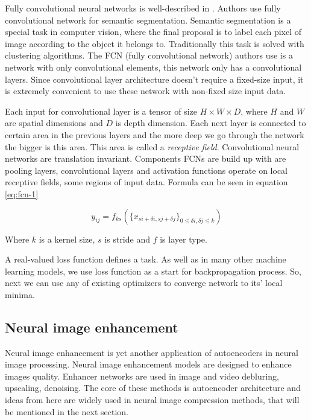 Fully convolutional neural networks is well-described in \cite{fcn}. Authors use fully convolutional network for semantic segmentation. Semantic segmentation is a special task in computer vision, where the final proposal is to label each pixel of image according to the object it belongs to. Traditionally this task is solved with clustering algorithms. The FCN (fully convolutional network) authors use is a network with only convolutional elements, this network only has a convolutional layers. Since convolutional layer architecture doesn't require a fixed-size input, it is extremely convenient to use these network with non-fixed size input data.

Each input for convolutional layer is a tensor of size $H \times W \times D$, where $H$ and $W$ are spatial dimensions and $D$ is depth dimension. Each next layer is connected to certain area in the previous layers and the more deep we go through the network the bigger is this area. This area is called a \textit{receptive field}. Convolutional neural networks are translation invariant. Components FCNs are build up with are pooling layers, convolutional layers and activation functions operate on local receptive fields, some regions of input data. Formula can be seen in equation \ref{eq:fcn-1}

\begin{equation}
    \label{eq:fcn-1}
    y_{ij} = f_{ks}(\{ x_{si + \delta i, sj + \delta j} \}_{0 \le \delta i, \delta j \le k})
\end{equation}

Where $k$ is a kernel size, $s$ is stride and $f$ is layer type.

A real-valued loss function defines a task. As well as in many other machine learning models, we use loss function as a start for backpropagation process. So, next we can use any of existing optimizers to converge network to its' local minima.

\subsection{Neural image enhancement}

Neural image enhancement is yet another application of autoencoders in neural image processing. Neural image enhancement models are designed to enhance images quality. Enhancer networks are used in image and video debluring, upscaling, denoising. The core of these methods is autoencoder architecture and ideas from here are widely used in neural image compression methods, that will be mentioned in the next section.

